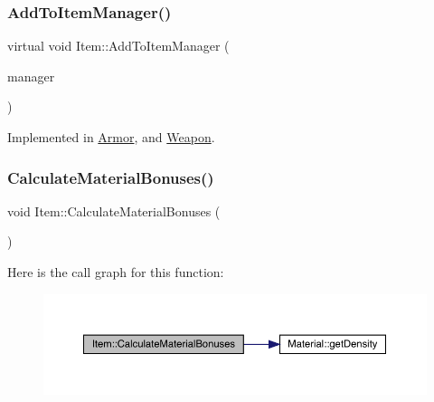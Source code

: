 \subsubsection{\texorpdfstring{Add\+To\+Item\+Manager()}{AddToItemManager()}}
{\footnotesize\ttfamily virtual void Item\+::\+Add\+To\+Item\+Manager (\begin{DoxyParamCaption}\item[{\mbox{\hyperlink{class_item_manager}{Item\+Manager}} \&}]{manager }\end{DoxyParamCaption})\hspace{0.3cm}{\ttfamily [pure virtual]}}



Implemented in \mbox{\hyperlink{class_armor_a008a9def7f07c141c87771937d856616}{Armor}}, and \mbox{\hyperlink{class_weapon_a241a74219d47374ffebebaad675dc250}{Weapon}}.

\mbox{\label{class_item_a8f02bc86b6f66142e35a660a5c28ba74}} 
\subsubsection{\texorpdfstring{Calculate\+Material\+Bonuses()}{CalculateMaterialBonuses()}}
{\footnotesize\ttfamily void Item\+::\+Calculate\+Material\+Bonuses (\begin{DoxyParamCaption}{ }\end{DoxyParamCaption})}

Here is the call graph for this function\+:
\nopagebreak
\begin{figure}[H]
\begin{center}
\leavevmode
\includegraphics[width=350pt]{dc/d32/class_item_a8f02bc86b6f66142e35a660a5c28ba74_cgraph}
\end{center}
\end{figure}
\mbox{\label{class_item_a6d963581e2caad2e08979683a827f39f}} 
